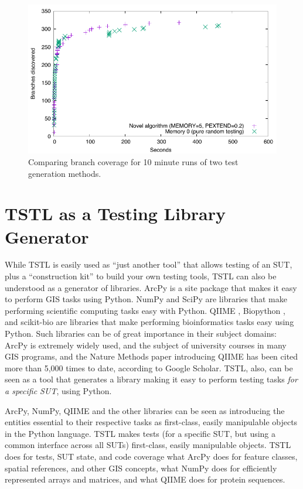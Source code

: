 \begin{figure}
\includegraphics[width=\columnwidth]{memory}
\caption{Comparing branch coverage for 10 minute runs of two test generation methods.}
\label{fig:compare}
\end{figure}

\section{TSTL as a Testing Library Generator}
\label{sec:langext}

While TSTL is easily used as ``just another tool'' that allows testing of an SUT, plus a ``construction kit'' to build your own testing tools, TSTL can also be understood as a generator of libraries.  ArcPy is a site package that makes it easy to perform GIS tasks using Python.  NumPy \cite{NumPy} and SciPy \cite{SciPy} are libraries that make performing scientific computing tasks easy with Python.  QIIME \cite{QIIME}, Biopython \cite{biopython}, and scikit-bio \cite{scikitbio} are libraries that make performing bioinformatics tasks easy using Python.  Such libraries can be of great importance in their subject domains:  ArcPy is extremely widely used, and the subject of university courses in many GIS programs, and the Nature Methods paper introducing QIIME has been cited more than 5,000 times to date, according to Google Scholar.  TSTL, also, can be seen as a tool that generates a library making it easy to perform testing tasks \emph{for a specific SUT}, using Python. 

ArcPy, NumPy, QIIME and the other libraries can be seen as introducing the entities essential to their respective tasks as first-class, easily manipulable objects in the Python language.  TSTL makes tests (for a specific SUT, but using a common interface across all SUTs) first-class, easily manipulable objects.  TSTL does for tests, SUT state, and code coverage what ArcPy does for feature classes, spatial references, and other GIS concepts, what NumPy does for efficiently represented arrays and matrices, and what QIIME does for protein sequences.

